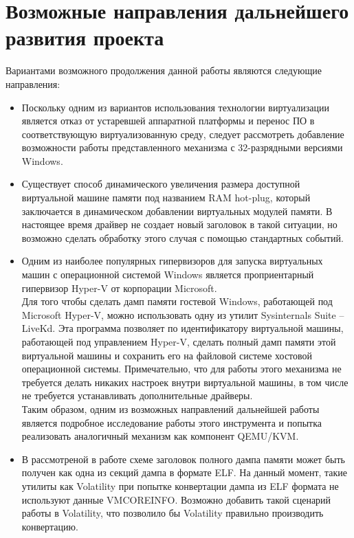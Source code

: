 \documentclass{mipt-thesis-bs}
\begin{document}
\chapter{Возможные направления дальнейшего развития проекта}

Вариантами возможного продолжения данной работы являются следующие направления:
\begin{itemize}
\item Поскольку одним из вариантов использования технологии виртуализации является отказ от устаревшей аппаратной платформы и перенос ПО в соответствующую виртуализованную среду, следует рассмотреть добавление возможности работы представленного механизма с 32-разрядными версиями Windows.
\item Существует способ динамического увеличения размера доступной виртуальной машине памяти под названием RAM hot-plug, который заключается в динамическом добавлении виртуальных модулей памяти. В настоящее время драйвер не создает новый заголовок в такой ситуации, но возможно сделать обработку этого случая с помощью стандартных событий.
\item Одним из наиболее популярных гипервизоров для запуска виртуальных машин с операционной системой Windows является проприентарный гипервизор Hyper-V от корпорации Microsoft.\\Для того чтобы сделать дамп памяти гостевой Windows, работающей под Microsoft Hyper-V, можно использовать одну из утилит Sysinternals Suite -- LiveKd\cite{livekd-hv}. Эта программа позволяет по идентификатору виртуальной машины, работающей под управлением Hyper-V, сделать полный дамп памяти этой виртуальной машины и сохранить его на файловой системе хостовой операционной системы. Примечательно, что для работы этого механизма не требуется делать никаких настроек внутри виртуальной машины, в том числе не требуется устанавливать дополнительные драйверы.\\Таким образом, одним из возможных направлений дальнейшей работы является подробное исследование работы этого инструмента и попытка реализовать аналогичный механизм как компонент QEMU/KVM.
\newpage
\item В рассмотреной в работе схеме заголовок полного дампа памяти может быть получен как одна из секций дампа в формате ELF. На данный момент, такие утилиты как Volatility при попытке конвертации дампа из ELF формата не используют данные VMCOREINFO. Возможно добавить такой сценарий работы в Volatility, что позволило бы Volatility правильно производить конвертацию.
\end{itemize}

\printbibliography
\end{document}
